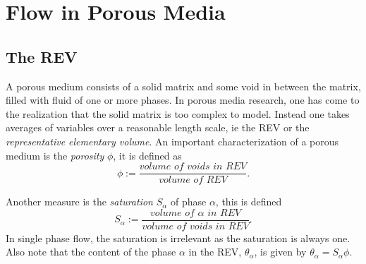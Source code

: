 \documentclass[../Main/main.tex]{subfiles}
\begin{document}
\graphicspath{{../Flow in porous media/figs/}}
\chapter{Flow in Porous Media}
\section*{The REV}\label{REV}
A porous medium consists of a solid matrix and some void in between the matrix, filled with fluid of one or more phases. In porous media research, one has come to the realization that the solid matrix is too complex to model. Instead one takes averages of variables over a reasonable length scale, ie the REV or the \emph{representative elementary volume}.
An important characterization of a porous medium is the \emph{porosity} $\phi$, it is defined as 
\begin{equation}
	\phi := \frac{\textit{volume of voids in REV}}{\textit{volume of REV}}.
\end{equation}

Another measure is the \emph{saturation} $S_{\alpha}$ of phase $\alpha$,  this is defined 
\begin{equation}
	S_{\alpha} := \frac{\textit{volume of }\alpha \textit{ in REV}}{\textit{volume of voids in REV}}.
\end{equation}
In single phase flow, the saturation is irrelevant as the saturation is always one. Also note that the content of the phase $\alpha$ in the REV, $\theta_{\alpha}$, is given by $\theta_{\alpha} = S_{\alpha} \phi$.
\end{document}
